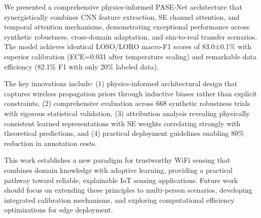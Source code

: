 \documentclass[journal]{IEEEtran}
\begin{document}
We presented a comprehensive physics-informed PASE-Net architecture that synergistically combines CNN feature extraction, SE channel attention, and temporal attention mechanisms, demonstrating exceptional performance across synthetic robustness, cross-domain adaptation, and sim-to-real transfer scenarios. The model achieves identical LOSO/LORO macro-F1 scores of 83.0±0.1\% with superior calibration (ECE=0.031 after temperature scaling) and remarkable data efficiency (82.1\% F1 with only 20\% labeled data).

The key innovations include: (1) physics-informed architectural design that captures wireless propagation priors through inductive biases rather than explicit constraints, (2) comprehensive evaluation across 668 synthetic robustness trials with rigorous statistical validation, (3) attribution analysis revealing physically consistent learned representations with SE weights correlating strongly with theoretical predictions, and (4) practical deployment guidelines enabling 80\% reduction in annotation costs.

This work establishes a new paradigm for trustworthy WiFi sensing that combines domain knowledge with adaptive learning, providing a practical pathway toward reliable, explainable IoT sensing applications. Future work should focus on extending these principles to multi-person scenarios, developing integrated calibration mechanisms, and exploring computational efficiency optimizations for edge deployment.
\end{document}
